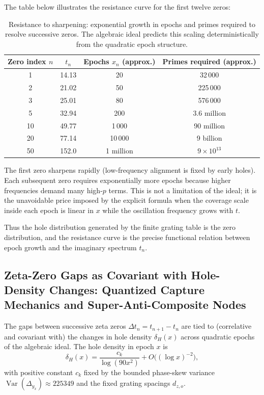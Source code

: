 \documentclass[11pt,a4paper]{article}
\begin{document}
The table below illustrates the resistance curve for the first twelve zeros:

\begin{table}[htbp]
\centering
\begin{tabular}{c|c|c|c}
Zero index \(n\) & \(t_n\) & Epochs \(x_n\) (approx.) & Primes required (approx.) \\
\hline
1  & 14.13 & 20   & 32\,000 \\
2  & 21.02 & 50   & 225\,000 \\
3  & 25.01 & 80   & 576\,000 \\
5  & 32.94 & 200  & 3.6 million \\
10 & 49.77 & 1\,000 & 90 million \\
20 & 77.14 & 10\,000 & 9 billion \\
50 & 152.0 & 1 million & \(9\times10^{13}\) \\
\end{tabular}
\caption{Resistance to sharpening: exponential growth in epochs and primes required to resolve successive zeros. The algebraic ideal predicts this scaling deterministically from the quadratic epoch structure.}
\label{tab:resistance-curve}
\end{table}

The first zero sharpens rapidly (low-frequency alignment is fixed by early holes). Each subsequent zero requires exponentially more epochs because higher frequencies demand many high-\(p\) terms. This is not a limitation of the ideal; it is the unavoidable price imposed by the explicit formula when the coverage scale inside each epoch is linear in \(x\) while the oscillation frequency grows with \(t\).

Thus the hole distribution generated by the finite grating table is the zero distribution, and the resistance curve is the precise functional relation between epoch growth and the imaginary spectrum \(t_n\).

\subsection{Zeta-Zero Gaps as Covariant with Hole-Density Changes: Quantized Capture Mechanics and Super-Anti-Composite Nodes}

The gaps between successive zeta zeros \(\Delta t_n = t_{n+1} - t_n\) are tied to (correlative and covariant with) the changes in hole density \(\delta_H(x)\) across quadratic epochs of the algebraic ideal. The hole density in epoch \(x\) is
\[
\delta_H(x) = \frac{c_k}{\log(90x^2)} + O\bigl((\log x)^{-2}\bigr),
\]
with positive constant \(c_k\) fixed by the bounded phase-skew variance \(\operatorname{Var}(\Delta_{y_x})\approx225349\) and the fixed grating spacings \(d_{z,o}\).
\end{document}
